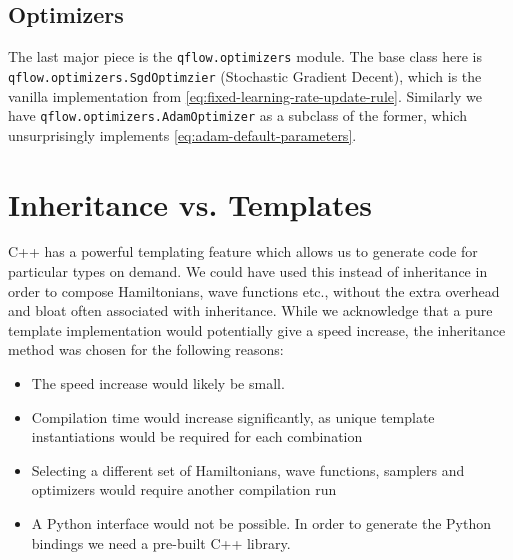 \documentclass[Thesis.tex]{subfiles}
\begin{document}
\subsection{Optimizers}

The last major piece is the \texttt{qflow.optimizers} module. The base class
here is \texttt{qflow.\-optimizers.\-SgdOptimzier} (Stochastic Gradient Decent),
which is the vanilla implementation from
\cref{eq:fixed-learning-rate-update-rule}. Similarly we have
\texttt{qflow.\-optimizers.\-AdamOptimizer} as a subclass of the former, which
unsurprisingly implements \cref{eq:adam-default-parameters}.


\section{Inheritance vs. Templates}

C++ has a powerful templating feature which allows us to generate code for
particular types on demand. We could have used this instead of inheritance in
order to compose Hamiltonians, wave functions etc., without the extra overhead
and bloat often associated with inheritance. While we acknowledge that a pure
template implementation would potentially give a speed increase, the inheritance
method was chosen for the following reasons:

\begin{itemize}
\item The speed increase would likely be small.
\item Compilation time would increase significantly, as unique template
  instantiations would be required for each combination
\item Selecting a different set of Hamiltonians, wave functions, samplers and
  optimizers would require another compilation run
\item A Python interface would not be possible. In order to generate the
  Python bindings we need a pre-built C++ library.
\end{itemize}
\end{document}
